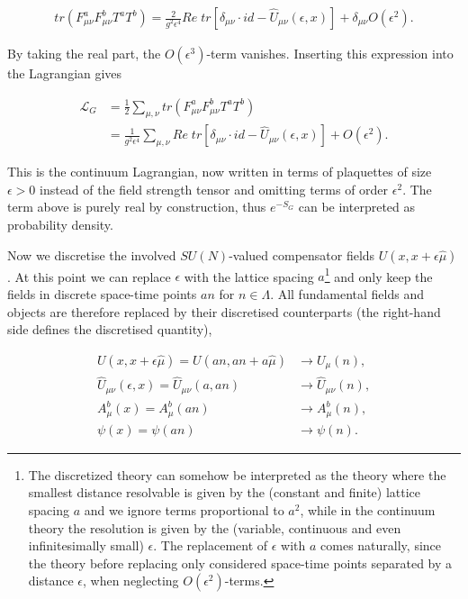\documentclass{article}
\theoremstyle{plain} %
\theoremstyle{convention} %
\theoremstyle{remark} %
\numberwithin{equation}{section}
\begin{document}
\begin{align*}
    tr( F_{\mu \nu}^a F_{\mu \nu}^b T^a T^b) = \frac{2}{g^2 \epsilon^4} Re \; tr\left[ \delta_{\mu \nu} \cdot id - \hat{U}_{\mu \nu}(\epsilon,x) \right] + \delta_{\mu \nu} O(\epsilon^{2}).
\end{align*}

 By taking the real part, the $O(\epsilon^3)$-term vanishes. Inserting this expression into the Lagrangian gives

\begin{align*}
    \mathcal{L}_G &= \frac{1}{2} \sum_{\mu, \nu} tr( F_{\mu \nu}^a F_{\mu \nu}^b T^a T^b) \\
    &= \frac{1}{g^2 \epsilon^4} \sum_{\mu, \nu} Re \; tr\left[ \delta_{\mu \nu} \cdot id - \hat{U}_{\mu \nu}(\epsilon,x) \right] + O(\epsilon^{2}).
\end{align*}

This is the continuum Lagrangian, now written in terms of plaquettes of size $\epsilon > 0$ instead of the field strength tensor and omitting terms of order $\epsilon^2$. The term above is purely real by construction, thus $e^{-S_G}$ can be interpreted as probability density.

Now we discretise the involved $SU(N)$-valued compensator fields $U(x,x+\epsilon \hat{\mu})$. At this point we can replace $\epsilon$ with the lattice spacing $a$\footnote{The discretized theory can somehow be interpreted as the theory where the smallest distance resolvable is given by the (constant and finite) lattice spacing $a$ and we ignore terms proportional to $a^2$, while in the continuum theory the resolution is given by the (variable, continuous and even infinitesimally small) $\epsilon$. The replacement of $\epsilon$ with $a$ comes naturally, since the theory before replacing only considered space-time points separated by a distance $\epsilon$, when neglecting $O(\epsilon^2)$-terms.} and only keep the fields in discrete space-time points $an$ for $n \in \Lambda$. All fundamental fields and objects are therefore replaced by their discretised counterparts (the right-hand side defines the discretised quantity),

\begin{align*}
    U(x,x + \epsilon \hat{\mu}) = U(an,an + a\hat{\mu}) &\longrightarrow U_{\mu}(n), \\
    \hat{U}_{\mu \nu}(\epsilon, x) = \hat{U}_{\mu \nu}(a, an) &\longrightarrow \hat{U}_{\mu \nu}(n), \\
    A_{\mu}^b(x) = A_{\mu}^b(an) &\longrightarrow A_{\mu}^b(n), \\
    \psi(x) = \psi(an) &\longrightarrow \psi(n).
\end{align*}
\end{document}
